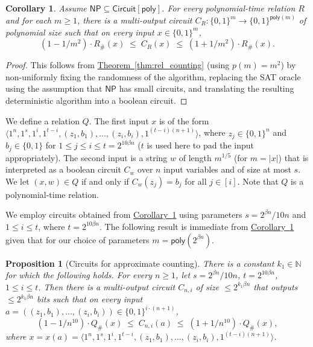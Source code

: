 \documentclass[11pt]{article}
\numberwithin{equation}{section}
\newtheorem{proposition}[theorem]{Proposition}
\newtheorem{corollary}[theorem]{Corollary}
\theoremstyle{definition}
\theoremstyle{plain}
\newcommand{\expref}[2]{\hyperref[#2]{#1~\ref{#2}}}
\begin{document}
\begin{corollary}\label{c:counting_circuits}
Assume $\mathsf{NP} \subseteq \mathsf{Circuit}[\mathsf{poly}]$. For every polynomial-time relation $R$ and for each $m \geq 1$, there is a multi-output circuit $C_R \colon \{0,1\}^m \to \{0,1\}^{\mathsf{poly}(m)}$ of polynomial size such that on every input $x \in \{0,1\}^m$,
$$
(1 - 1/m^2) \cdot R_{\#}(x) \;\leq\; C_R(x) \;\leq\; (1 + 1/m^2) \cdot R_{\#}(x).
$$ 
\end{corollary}

\begin{proof}
This follows from \expref{Theorem}{thm:rel_counting} (using $p(m) = m^2$) by non-uniformly fixing the randomness of the algorithm, replacing the SAT oracle using the assumption that $\mathsf{NP}$ has small circuits, and translating the resulting deterministic algorithm into a boolean circuit.
\end{proof}

We define a relation $Q$. The first input $x$ is of the form $\langle 1^n, 1^s, 1^{i}, 1^{t-i}, (z_1, b_1), \ldots, (z_{i}, b_{i}), 1^{(t-i)(n+1)} \rangle$, where $z_j \in \{0,1\}^n$ and $b_j \in \{0,1\}$ for $1 \leq j \leq i\le t = 2^{10\beta n}$ ($t$ is used here to pad the input appropriately). The second input is a string $w$ of length $m^{1/5}$ (for $m = |x|$) that is interpreted as a boolean circuit $C_w$ over $n$ input variables and of size at most $s$. We let $(x,w) \in Q$ if and only if $C_w(z_j) = b_j$ for all $j \in [i]$. Note that $Q$ is a polynomial-time relation.

We employ circuits obtained from \expref{Corollary}{c:counting_circuits} using parameters $s = 2^{\beta n}/10n$ and $1 \leq i \leq t$, where $t = 2^{10\beta n}$. The following result is immediate from \expref{Corollary}{c:counting_circuits} given that for our choice of parameters $m = \mathsf{poly}(2^{\beta n})$.

\begin{proposition}[Circuits for approximate counting]\label{p:circuis_for_counting}
There is a constant $k_1 \in \mathbb{N}$ for which the following holds. For every $n \geq 1$, let $s = 2^{\beta n}/10n$, $t = 2^{10\beta n}$,  $1 \leq i \leq t$. Then there is a multi-output circuit $C_{n,i}$ of size $\leq 2^{k_1 \beta n}$ that outputs $\leq 2^{k_1 \beta n}$ bits such that on every input $a = ((z_1, b_1), \ldots, (z_{i}, b_{i})) \in \{0,1\}^{i \cdot(n + 1)}$,
$$
(1 - 1/n^{10}) \cdot Q_{\#}(x) \;\leq\; C_{n,i}(a) \;\leq\; (1 + 1/n^{10}) \cdot Q_{\#}(x),
$$
where $x = x(a)=\langle 1^n, 1^s, 1^{i}, 1^{t-i}, (z_1, b_1), \ldots, (z_{i}, b_{i}), 1^{(t-i)(n+1)} \rangle$.
\end{proposition}
\end{document}

